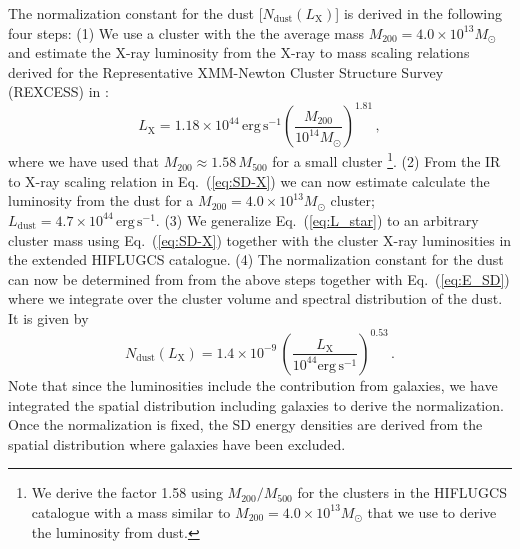 \documentclass[10pt,aps,pra,reprint,amsmath,amsfonts,amssymb,showpacs]{revtex4-1}
\newcommand{\rmn}{\mathrm}
\newcommand{\msun}{M_\odot}
\newcommand{\dust}{\rmn{dust}}
\newcommand{\lx}{L_\rmn{X}}
\newcommand{\mvir}{M_{200}}
\begin{document}
The normalization constant for the dust [$N_\dust(\lx)$] is derived in the
following four steps: (1) We use a cluster with the the average mass
$\mvir=4.0\times10^{13}\msun$ and estimate the X-ray luminosity from
the X-ray to mass scaling relations derived for the Representative
XMM-Newton Cluster Structure Survey (REXCESS) in
\cite{2009A&A...498..361P}:
\begin{equation}
\lx=1.18\times 10^{44}\,\rmn{erg\,s}^{-1}
\left(\frac{M_{200}}{10^{14}\msun}\right)^{1.81}\,,
\end{equation}
where we have used that $M_\rmn{200} \approx 1.58\,M_\rmn{500}$ for a
small cluster \footnote{We derive the factor 1.58 using
  $M_\rmn{200}/M_\rmn{500}$ for the clusters in the HIFLUGCS catalogue
  with a mass similar to $\mvir=4.0\times10^{13}\msun$ that we use to
  derive the luminosity from dust.}. (2) From the IR to X-ray scaling
relation in Eq.~(\ref{eq:SD-X}) we can now estimate calculate the
luminosity from the dust for a $\mvir=4.0\times10^{13}\msun$ cluster;
$L_\dust=4.7\times10^{44}\,\rmn{erg\,s}^{-1}$. (3) We generalize
Eq.~(\ref{eq:L_star}) to an arbitrary cluster mass using
Eq.~(\ref{eq:SD-X}) together with the cluster X-ray luminosities in
the extended HIFLUGCS catalogue. (4) The normalization constant for
the dust can now be determined from from the above steps together with
Eq.~(\ref{eq:E_SD}) where we integrate over the cluster volume and
spectral distribution of the dust. It is given by
\begin{equation}
 N_\dust(\lx) = 1.4\times10^{-9}\,
\left(\frac{\lx}{10^{44}\rmn{erg\,s}^{-1}}\right)^{0.53}\,.
\label{eq:N_stars}
\end{equation}
Note that since the luminosities include the contribution from
galaxies, we have integrated the spatial distribution including
galaxies to derive the normalization. Once the normalization is fixed,
the SD energy densities are derived from the spatial distribution
where galaxies have been excluded.
\end{document}
